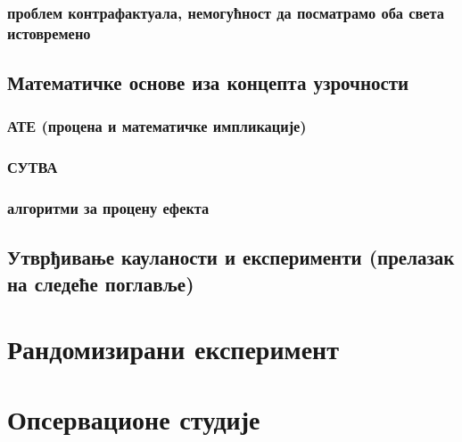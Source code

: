 \documentclass[12pt, a4paper]{article}
\begin{document}
    \subsubsection{проблем контрафактуала, немогућност да посматрамо оба света истовремено}
\subsection{Математичке основе иза концепта узрочности}
    \subsubsection{АТЕ (процена и математичке импликације)}
    \subsubsection{СУТВА}
    \subsubsection{алгоритми за процену ефекта}
\subsection{Утврђивање кауланости и експерименти (прелазак на следеће поглавље)}

\newpage



\section{Рандомизирани експеримент}
\newpage



\section{Опсервационе студије}
\end{document}
